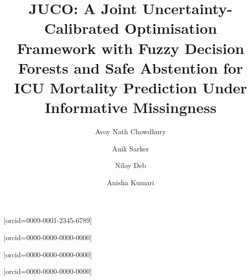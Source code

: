 \documentclass[a4paper,fleqn,longmktitle]{cas-sc}
\begin{document}
	
	
\title{JUCO: A Joint Uncertainty-Calibrated Optimisation Framework with
	Fuzzy Decision Forests and Safe Abstention for ICU Mortality
	Prediction Under Informative Missingness}
	
	
	

\author[1]{Avoy Nath Chowdhury}[orcid=0009-0001-2345-6789]
\cormark[1]

\author[1]{Anik Sarker}[orcid=0000-0000-0000-0000]

\author[1]{Niloy Deb}[orcid=0000-0000-0000-0000]

\author[2]{Anisha Kumari}[orcid=0000-0000-0000-0000]

\address[1]{School of Computer Engineering, KIIT Deemed to be University,
	Bhubaneswar, Odisha, India}
\address[2]{Department of Computer Science and Engineering, Motilal Nehru National Institute of Technology, Allahabad, Uttar Pradesh India}
	
\end{document}
